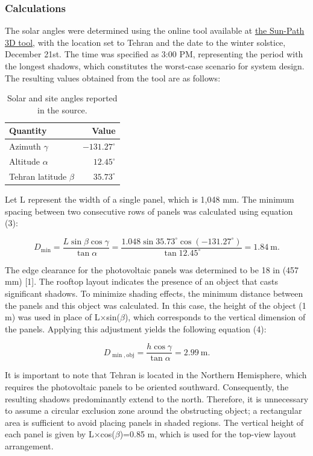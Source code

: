 \documentclass[11pt,a4paper]{article}
\begin{document}
\subsubsection{Calculations}

The solar angles were determined using the online tool available at \href{https://andrewmarsh.com/apps/staging/sunpath3d.html}{the Sun-Path 3D tool}, with the location set to Tehran and the date to the winter solstice, December 21st. The time was specified as 3:00 PM, representing the period with the longest shadows, which constitutes the worst-case scenario for system design. The resulting values obtained from the tool are as follows:

\begin{table}[H]\centering\caption{Solar and site angles reported in the source.}\begin{tabular}{lr}\toprule Quantity & Value\\\midrule Azimuth $\gamma$ & $-131.27^\circ$\\Altitude $\alpha$ & $12.45^\circ$\\Tehran latitude $\beta$ & $35.73^\circ$\\\bottomrule\end{tabular}\end{table}

Let L represent the width of a single panel, which is 1,048 mm. The minimum spacing between two consecutive rows of panels was calculated using equation (3):

\begin{equation}D_{\min}=\frac{L\sin\beta\cos\gamma}{\tan\alpha}=\frac{1.048\sin35.73^\circ\cos(-131.27^\circ)}{\tan12.45^\circ}=1.84\ \mathrm{m}.\end{equation}

The edge clearance for the photovoltaic panels was determined to be 18 in (457 mm) [1]. The rooftop layout indicates the presence of an object that casts significant shadows. To minimize shading effects, the minimum distance between the panels and this object was calculated. In this case, the height of the object (1 m) was used in place of L×sin($\beta$), which corresponds to the vertical dimension of the panels. Applying this adjustment yields the following equation (4):

\begin{equation}D_{\min,\mathrm{obj}}=\frac{h\cos\gamma}{\tan\alpha}=2.99\ \mathrm{m}.\end{equation}

It is important to note that Tehran is located in the Northern Hemisphere, which requires the photovoltaic panels to be oriented southward. Consequently, the resulting shadows predominantly extend to the north. Therefore, it is unnecessary to assume a circular exclusion zone around the obstructing object; a rectangular area is sufficient to avoid placing panels in shaded regions. The vertical height of each panel is given by L×cos($\beta$)=0.85 m, which is used for the top-view layout arrangement.
\end{document}
